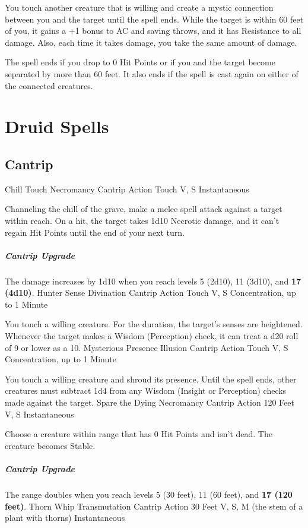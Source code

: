 \documentclass[letterpaper,openany,oneside,twocolumn]{book}
\begin{document}
You touch another creature that is willing and create a mystic connection between you and the target until the spell ends. While the target is within 60 feet of you, it gains a +1 bonus to AC and saving throws, and it has Resistance to all damage. Also, each time it takes damage, you take the same amount of damage.

The spell ends if you drop to 0 Hit Points or if you and the target become separated by more than 60 feet. It also ends if the spell is cast again on either of the connected creatures.
\clearpage
\section*{Druid Spells}
\subsection*{Cantrip}
\DndSpellHeader
  {Chill Touch}
  {Necromancy Cantrip}
  {Action}
  {Touch}
  {V, S}
  {Instantaneous}

Channeling the chill of the grave, make a melee spell attack against a target within reach. On a hit, the target takes 1d10 Necrotic damage, and it can't regain Hit Points until the end of your next turn.

\subparagraph*{Cantrip Upgrade} The damage increases by 1d10 when you reach levels 5 (2d10), 11 (3d10), and \textbf{17 (4d10)}.
\DndSpellHeader
  {Hunter Sense}
  {Divination Cantrip}
  {Action}
  {Touch}
  {V, S}
  {Concentration, up to 1 Minute}

You touch a willing creature. For the duration, the target's senses are heightened. Whenever the target makes a Wisdom (Perception) check, it can treat a d20 roll of 9 or lower as a 10.
\DndSpellHeader
  {Mysterious Presence}
  {Illusion Cantrip}
  {Action}
  {Touch}
  {V, S}
  {Concentration, up to 1 Minute}

You touch a willing creature and shroud its presence. Until the spell ends, other creatures must subtract 1d4 from any Wisdom (Insight or Perception) checks made against the target.
\DndSpellHeader
  {Spare the Dying}
  {Necromancy Cantrip}
  {Action}
  {120 Feet}
  {V, S}
  {Instantaneous}

Choose a creature within range that has 0 Hit Points and isn't dead. The creature becomes Stable.

\subparagraph*{Cantrip Upgrade} The range doubles when you reach levels 5 (30 feet), 11 (60 feet), and \textbf{17 (120 feet)}.
\DndSpellHeader
  {Thorn Whip}
  {Transmutation Cantrip}
  {Action}
  {30 Feet}
  {V, S, M (the stem of a plant with thorns)}
  {Instantaneous}
\end{document}
